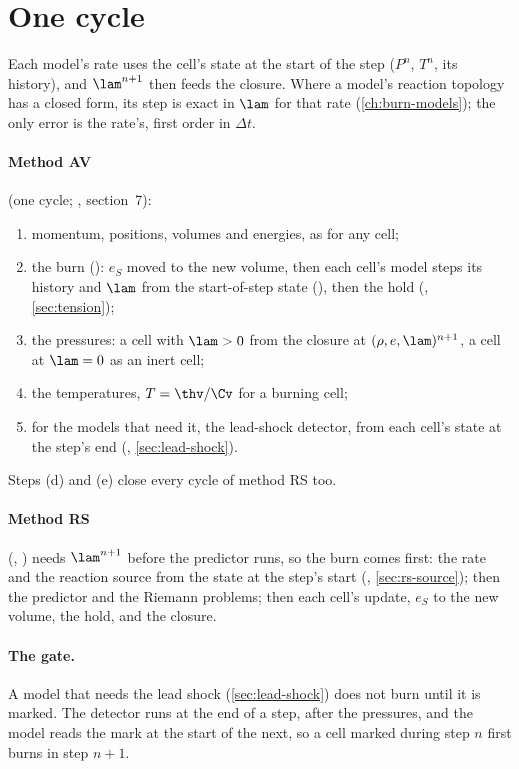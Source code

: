 \section{One cycle}
\label{sec:one-cycle}

Each model's rate uses the cell's state at the start of the step ($P^n$,
$T^n$, its history), and $\lam^{n+1}$ then feeds the closure. Where a
model's reaction topology has a closed form, its step is exact in $\lam$ for
that rate (\cref{ch:burn-models}); the only error is the rate's, first order
in $\Delta t$.

\paragraph{Method AV} (one cycle; , section~7):
\begin{enumerate}[label=(\alph*)]
\item momentum, positions, volumes and energies, as for any cell;
\item the burn (): $e_S$ moved to the new volume, then each
  cell's model steps its history and $\lam$ from the start-of-step state
  (), then the hold (,
  \cref{sec:tension});
\item the pressures: a cell with $\lam > 0$ from the closure at
  $(\rho, e, \lam)^{n+1}$, a cell at $\lam = 0$ as an inert cell;
\item the temperatures, $T = \thv/\Cv$ for a burning cell;
\item for the models that need it, the lead-shock detector, from each
  cell's state at the step's end (,
  \cref{sec:lead-shock}).
\end{enumerate}
Steps (d) and (e) close every cycle of method RS too.

\paragraph{Method RS} (, ) needs $\lam^{n+1}$
before the predictor runs, so the burn comes first: the rate and the
reaction source from the state at the step's start
(, \cref{sec:rs-source}); then the predictor and the
Riemann problems; then each cell's update, $e_S$ to the new volume, the
hold, and the closure.

\paragraph{The gate.} A model that needs the lead shock
(\cref{sec:lead-shock}) does not burn until it is marked. The detector runs
at the end of a step, after the pressures, and the model reads the mark at
the start of the next, so a cell marked during step $n$ first burns in step
$n + 1$.

